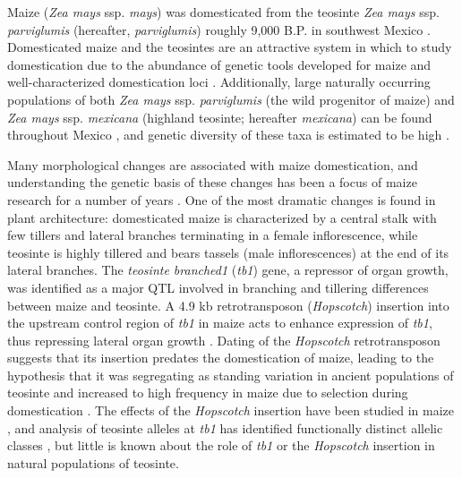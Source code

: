 \documentclass[11pt]{article}
\begin{document}
\begin{linenumbers}
\begin{flushleft}
Maize (\emph{Zea mays} ssp. \emph{mays}) was domesticated from the teosinte \emph{Zea mays} ssp. \emph{parviglumis} (hereafter, \emph{parviglumis}) roughly 9,000 B.P. in southwest Mexico \citep{Piperno2009, Matsuoka2002}. Domesticated maize and the teosintes are an attractive system in which to study domestication due to the abundance of genetic tools developed for maize and well-characterized domestication loci \citep{Hufford2012a, Doebley2004, Hufford2012b}. Additionally, large naturally occurring populations of both \emph{Zea mays} ssp. \emph{parviglumis} (the wild progenitor of maize) and \emph{Zea mays} ssp. \emph{mexicana} (highland teosinte; hereafter \emph{mexicana}) can be found throughout Mexico \citep{Wilkes1977, Hufford2013}, and genetic diversity of these taxa is estimated to be high \citep{Ross-Ibarra2009}.

Many morphological changes are associated with maize domestication, and understanding the genetic basis of these changes has been a focus of maize research for a number of years \citep{Doebley2004}. One of the most dramatic changes is found in plant architecture: domesticated maize is characterized by a central stalk with few tillers and lateral branches terminating in a female inflorescence, while teosinte is highly tillered and bears tassels (male inflorescences) at the end of its lateral branches. The \emph{teosinte branched1} (\emph{tb1}) gene, a repressor of organ growth, was identified as a major QTL involved in  branching \citep{DoebleyStecGustus1995} and tillering \citep{DoebleyStec1991} differences between maize and teosinte.  A 4.9 kb retrotransposon (\emph{Hopscotch}) insertion into the upstream control region of \emph{tb1} in maize acts to enhance expression of \emph{tb1}, thus repressing lateral organ growth \citep{Doebley1997, Studer2011}.  Dating of the \emph{Hopscotch} retrotransposon suggests that its insertion predates the domestication of maize, leading to the hypothesis that it was segregating as standing variation in ancient populations of teosinte and increased to high frequency in maize due to selection during domestication \citep{Studer2011}. The effects of the \emph{Hopscotch} insertion have been studied in maize \citep{Studer2011}, and analysis of teosinte alleles at \emph{tb1} has identified functionally distinct allelic classes \citet{StuderDoebley2012}, but little is known about the role of \emph{tb1} or the \emph{Hopscotch} insertion in natural populations of teosinte.


\end{flushleft}
\end{linenumbers}
\end{document}
